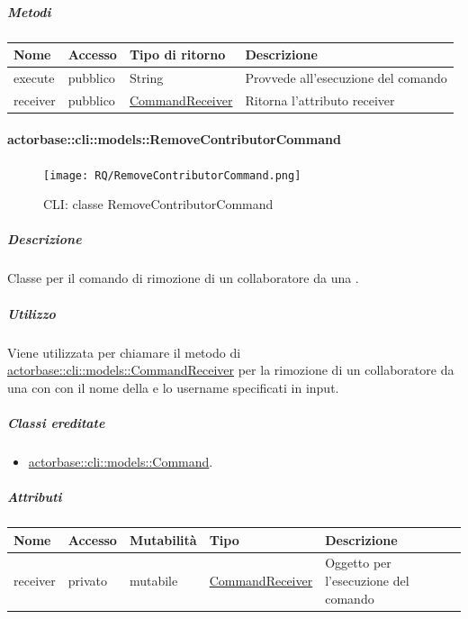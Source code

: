 \documentclass{scalatekids-article}
\begin{document}
\subparagraph{Metodi}

\begin{tabular}{| p{3cm} | p{1.5cm} | p{3.5cm} | p{9cm} |}
  \hline
  Nome & Accesso & Tipo di ritorno & Descrizione\\
  \hline
  execute & pubblico & String & Provvede all'esecuzione del comando\\
  \hline
  receiver & pubblico & \hyperref[sec:actorbase::cli::models::CommandReceiver]{CommandReceiver} & Ritorna l'attributo receiver\\
  \hline
\end{tabular}

\paragraph{actorbase::cli::models::RemoveContributorCommand}
\label{sec:actorbase::cli::models::RemoveContributorCommand}

\begin{figure}[H]
  \begin{center}
    \texttt{[image: RQ/RemoveContributorCommand.png]}
    \caption{CLI: classe RemoveContributorCommand}
  \end{center}
\end{figure}

\subparagraph{Descrizione}

Classe per il comando di rimozione di un collaboratore da una .

\subparagraph{Utilizzo}

Viene utilizzata per chiamare il metodo di
\hyperref[sec:actorbase::cli::models::CommandReceiver]{actorbase::cli::models::CommandReceiver} per la rimozione di un collaboratore
da una  con con il nome della  e lo username
specificati in input.

\subparagraph{Classi ereditate}

\begin{itemize}
\item \hyperref[sec:actorbase::cli::models::Command]{actorbase::cli::models::Command}.
\end{itemize}

\subparagraph{Attributi}

\begin{tabular}{| p{1cm} | p{1.5cm} | p{2cm} | p{4cm} | p{8.5cm} |}
  \hline
  Nome & Accesso & Mutabilità & Tipo & Descrizione\\
  \hline
  receiver & privato & mutabile & \hyperref[sec:actorbase::cli::models::CommandReceiver]{CommandReceiver} & Oggetto per l'esecuzione del comando\\
  \hline
\end{tabular}
\end{document}
